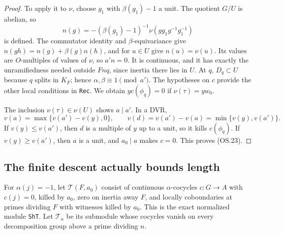 \begin{proof}
To apply it to $\nu$, choose $g_1$ with $\beta(g_1)-1$ a unit.
The quotient $G/U$ is abelian, so
\[
 n(g)=-(\beta(g_1)-1)^{-1}
                \nu(gg_1g^{-1}g_1^{-1})
 \tag{OS.26}
\]
is defined.  The commutator identity and $\beta$-equivariance give
$n(gh)=n(g)+\beta(g)n(h)$, and for $u\in U$ give $n(u)=\nu(u)$.
Its values are $O$-multiples of values of $\nu$, so $a'n=0$.
It is continuous, and it has exactly the unramifiedness needed
outside $Fnq$, since inertia there lies in $U$.
At $q$, $D_q\subset U$ because $q$ splits in $K_F$; hence
$\alpha,\beta\equiv1\pmod{a'}$.  The hypotheses on $c$
provide the other local conditions in \texttt{Rec}.
We obtain $y c(\phi_q)=0$ if $\nu(\tau)=yw_0$.

The inclusion $\nu(\tau)\in\nu(U)$ shows $a\mid a'$.
In a DVR,
\[
 v(a)=\max\{v(a')-v(y),0\},\qquad
 v(d)=v(a')-v(a)=\min\{v(y),v(a')\}.
\]
If $v(y)\le v(a')$, then $d$ is a multiple of $y$ up to a unit,
so it kills $c(\phi_q)$.  If $v(y)\ge v(a')$, then $a$ is a
unit, and $a_0\mid a$ makes $c=0$.
This proves (OS.23).
\end{proof}

\subsection{The finite descent actually bounds length}

For $\alpha(j)=-1$, let $\mathcal T(F,a_0)$ consist of continuous
$\alpha$-cocycles $c:G\to A$ with $c(j)=0$, killed by $a_0$,
zero on inertia away $F$, and locally coboundaries at primes
dividing $F$ with witnesses killed by $a_0$.
This is the exact normalized module \texttt{ShT}.
Let $\mathcal T_n$ be its submodule whose cocycles vanish on every
decomposition group above a prime dividing $n$.

